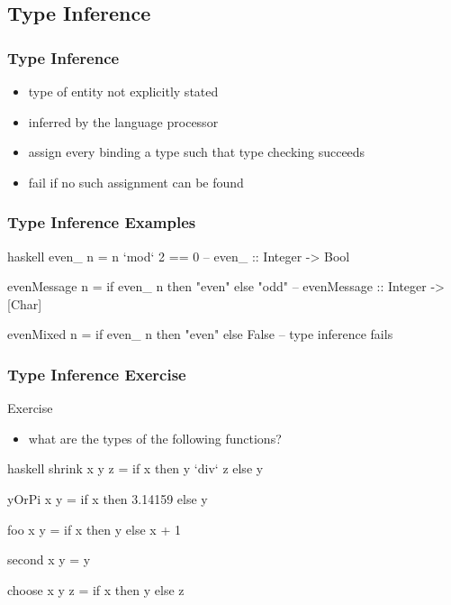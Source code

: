 \documentclass[dvipsnames]{beamer}
\theoremstyle{plain}
\begin{document}
\subsection{Type Inference}

\begin{frame}
  \frametitle{Type Inference}

  \begin{itemize}
    \item type of entity not explicitly stated
    \item inferred by the language processor

    \pause
    \medskip
    \item assign every binding a type such that type checking succeeds
    \item fail if no such assignment can be found
  \end{itemize}
\end{frame}

\begin{frame}[fragile]
  \frametitle{Type Inference Examples}

  \begin{example}[Haskell]
    \begin{pygments}{haskell}
even_ n = n `mod` 2 == 0
-- even_ :: Integer -> Bool

evenMessage n = if even_ n then "even" else "odd"
-- evenMessage :: Integer -> [Char]

evenMixed n = if even_ n then "even" else False
-- type inference fails
    \end{pygments}
  \end{example}
\end{frame}

\begin{frame}[fragile]
  \frametitle{Type Inference Exercise}

  \begin{block}{Exercise}
    \begin{itemize}
      \item what are the types of the following functions?
    \end{itemize}

    \medskip
    \begin{pygments}{haskell}
shrink x y z = if x then y `div` z else y

yOrPi x y = if x then 3.14159 else y

foo x y = if x then y else x + 1

second x y = y

choose x y z = if x then y else z
    \end{pygments}
  \end{block}
\end{frame}
\end{document}
